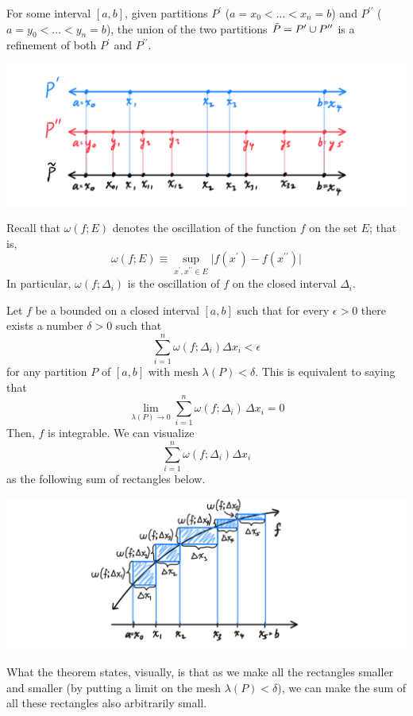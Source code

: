 \documentclass{article}
\begin{document}
    \begin{example}
    For some interval $[a, b]$, given partitions $P^\prime$ ($a = x_0 < \ldots < x_n = b$) and $P^{\prime\prime}$ ($a = y_0 < \ldots < y_n = b$), the union of the two partitions $\Tilde{P} = P^\prime \cup P^{\prime\prime}$ is a refinement of both $P^\prime$ and $P^{\prime\prime}$. 
    \begin{center}
        \includegraphics[scale=0.25]{img/Refinement_as_Union_of_Partitions.PNG}
    \end{center}
    \end{example}

      Recall that $\omega(f; E)$ denotes the oscillation of the function $f$ on the set $E$; that is, 
      \[\omega(f; E) \equiv \sup_{x^\prime, x^{\prime\prime} \in E} \big| f(x^\prime) - f(x^{\prime\prime})\big|\]
      In particular, $\omega(f; \Delta_i)$ is the oscillation of $f$ on the closed interval $\Delta_i$. 

      \begin{theorem}
      Let $f$ be a bounded on a closed interval $[a, b]$ such that for every $\epsilon > 0$ there exists a number $\delta>0$ such that
      \[\sum_{i=1}^n \omega(f; \Delta_i) \Delta x_i < \epsilon\]
      for any partition $P$ of $[a, b]$ with mesh $\lambda(P) < \delta$. This is equivalent to saying that
      \[\lim_{\lambda(P) \rightarrow 0} \sum_{i = 1}^n \omega (f; \Delta_i) \, \Delta x_i = 0\]
      Then, $f$ is integrable. We can visualize
      \[\sum_{i=1}^n \omega(f; \Delta_i) \Delta x_i\]
      as the following sum of rectangles below. 
      \begin{center}
          \includegraphics[scale=0.25]{img/Sufficient_Condition_for_Integrability.PNG}
      \end{center}
      What the theorem states, visually, is that as we make all the rectangles smaller and smaller (by putting a limit on the mesh $\lambda(P)<\delta$), we can make the sum of all these rectangles also arbitrarily small. 
      \end{theorem}
\end{document}
